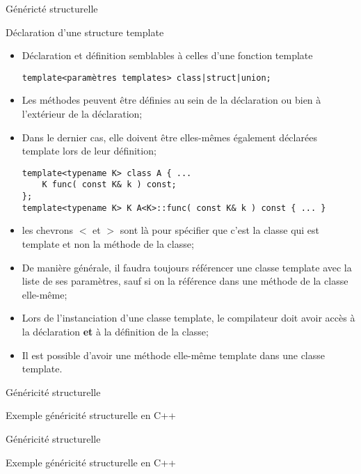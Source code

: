 \documentclass[handout,10pt]{beamer}
\newcommand{\includepartcode}[4][cpp]{

}
\begin{document}
\begin{frame}[fragile]{Généricté structurelle}
\tiny
\begin{block}{Déclaration d'une structure template}
\begin{itemize}
\item Déclaration et définition semblables à celles d'une fonction template
\begin{lstlisting}
template<paramètres templates> class|struct|union; 
\end{lstlisting}
\item Les méthodes peuvent être définies au sein de la déclaration ou bien à l'extérieur de la déclaration;
\item Dans le dernier cas, elle doivent être elles-mêmes également déclarées template lors de leur définition;
\begin{lstlisting}
template<typename K> class A { ...
    K func( const K& k ) const;
};
template<typename K> K A<K>::func( const K& k ) const { ... }
\end{lstlisting}
\item les chevrons $<$ et $>$ sont là pour spécifier que c'est la classe qui est template et non la méthode de la classe;
\item De manière générale, il faudra toujours référencer une classe template avec la liste de ses paramètres, sauf si on la référence dans une méthode de la classe elle-même;
\item Lors de l'instanciation d'une classe template, le compilateur doit avoir accès à la déclaration \textbf{et} à la définition de la classe;
\item Il est possible d'avoir une méthode elle-même template dans une classe template.
\end{itemize}
\end{block}
\end{frame}

\begin{frame}[fragile]{Généricité structurelle}
\tiny
\begin{exampleblock}{Exemple généricité structurelle en C++}
\includepartcode{template_struct.cpp}{4}{28}
\end{exampleblock}
\end{frame}

\begin{frame}[fragile]{Généricité structurelle}
\tiny
\begin{exampleblock}{Exemple généricité structurelle en C++}
\includepartcode{template_struct.cpp}{29}{52}
\end{exampleblock}
\end{frame}
\end{document}
